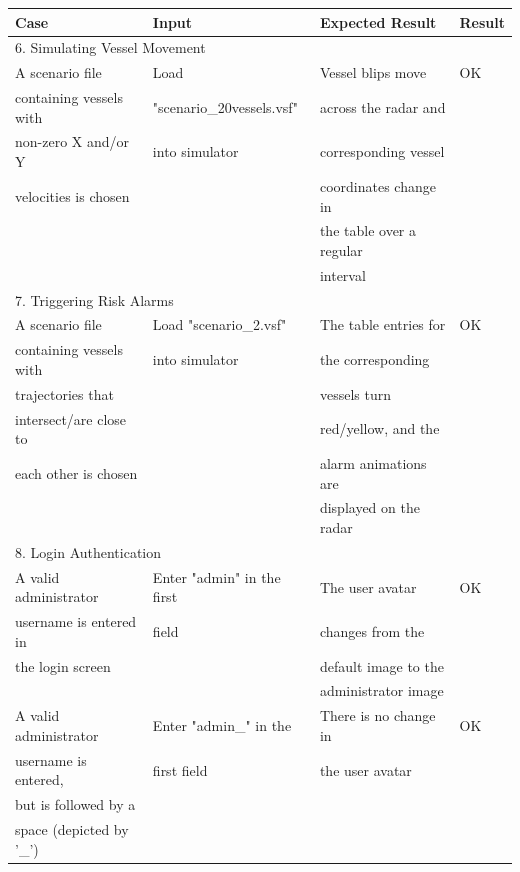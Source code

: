 \documentclass[12pt]{article}
\begin{document}
\begin{table}[ht]
\centering
   \begin{tabular}{|l|l|l|l|}
        \hline
        {\large Case} & {\large Input} & {\large Expected Result} & {\large Result}\\
        \hline\hline
        \multicolumn{4}{|l|}{6. Simulating Vessel Movement} \\
        \hline
        A scenario file & Load & Vessel blips move & OK\\
        containing vessels with & "scenario\_20vessels.vsf"  & across the radar and & \\
        non-zero X and/or Y &  into simulator & corresponding vessel &\\
        velocities is chosen & & coordinates change in &\\
         & & the table over a regular&\\
         & & interval&\\
        \hline
        \multicolumn{4}{|l|}{7. Triggering Risk Alarms} \\
        \hline
        A scenario file & Load "scenario\_2.vsf" & The table entries for & OK\\
        containing vessels with & into simulator & the corresponding&\\
        trajectories that & & vessels turn&\\
        intersect/are close to & & red/yellow, and the&\\
        each other is chosen & & alarm animations are&\\
         & & displayed on the radar&\\
         \hline
        \multicolumn{4}{|l|}{8. Login Authentication} \\
        \hline
       A valid administrator & Enter "admin" in the first & The user avatar & OK\\
       username is entered in & field & changes from the & \\
       the login screen & & default image to the& \\
        & & administrator image &\\
        \hline
        A valid administrator & Enter "admin\_" in the & There is no change in & OK\\
        username is entered, & first field & the user avatar &\\
        but is followed by a & & &\\
        space (depicted by '\_') &  & &\\

\end{tabular}
\end{table}
\end{document}
